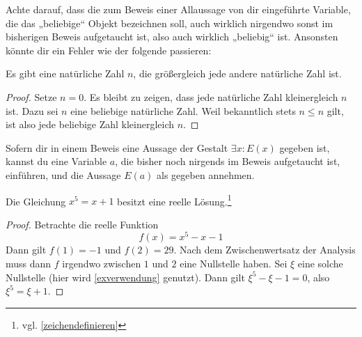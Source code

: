 \begin{bem}[*]
    Achte darauf, dass die zum Beweis einer Allaussage von dir eingeführte Variable, die das „beliebige“ Objekt bezeichnen soll, auch wirklich nirgendwo sonst im bisherigen Beweis aufgetaucht ist, also auch wirklich „beliebig“ ist. Ansonsten könnte dir ein Fehler wie der folgende passieren:
    \begin{bsp}[*]
        Es gibt eine natürliche Zahl $n$, die größergleich jede andere natürliche Zahl ist.
    \end{bsp}
    \begin{proof}\let\qed\relax
        Setze $n=0$. Es bleibt zu zeigen, dass jede natürliche Zahl kleinergleich $n$ ist. Dazu sei $n$ eine beliebige natürliche Zahl. Weil bekanntlich stets $n\le n$ gilt, ist also jede beliebige Zahl kleinergleich $n$.
    \end{proof}
\end{bem}


\begin{axiom} \label{exverwendung}
    Sofern dir in einem Beweis eine Aussage der Gestalt $\exists x: E(x)$ gegeben ist, kannst du eine Variable $a$, die bisher noch nirgends im Beweis aufgetaucht ist, einführen, und die Aussage $E(a)$ als gegeben annehmen.
\end{axiom}
  
  
\begin{bsp}[*] \label{bsp:exverwendung}
    Die Gleichung $x^5=x+1$ besitzt eine reelle Lösung.\footnote{vgl. \cref{zeichendefinieren}}
\end{bsp}
\begin{proof}
    Betrachte die reelle Funktion
        \[ f(x) = x^5-x-1 \]
    Dann gilt $f(1)=-1$ und $f(2)=29$. Nach dem Zwischenwertsatz der Analysis muss dann $f$ irgendwo zwischen $1$ und $2$ eine Nullstelle haben. Sei $\xi$ eine solche Nullstelle (hier wird \cref{exverwendung} genutzt). Dann gilt $\xi^5-\xi-1=0$, also $\xi^5=\xi +1$.
\end{proof}


